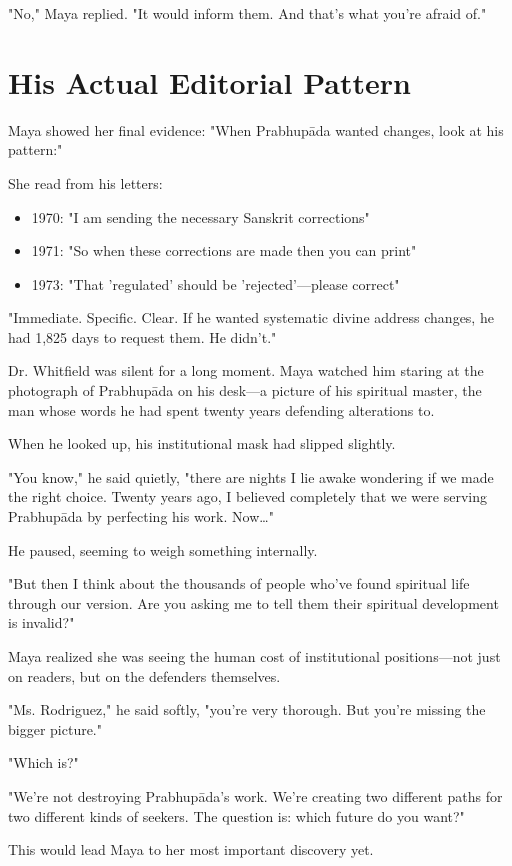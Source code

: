 \documentclass[11pt,twoside]{book}
\begin{document}
"No," Maya replied. "It would inform them. And that's what you're afraid of."
\section*{His Actual Editorial Pattern}
\label{sec:orgf6348cf}

Maya showed her final evidence: "When Prabhupāda wanted changes, look at his pattern:"

She read from his letters:
\begin{itemize}
\item 1970: "I am sending the necessary Sanskrit corrections"
\item 1971: "So when these corrections are made then you can print"
\item 1973: "That 'regulated' should be 'rejected'—please correct"
\end{itemize}

"Immediate. Specific. Clear. If he wanted systematic divine address changes, he had 1,825 days to request them. He didn't."

Dr. Whitfield was silent for a long moment. Maya watched him staring at the photograph of Prabhupāda on his desk—a picture of his spiritual master, the man whose words he had spent twenty years defending alterations to.

When he looked up, his institutional mask had slipped slightly. 

"You know," he said quietly, "there are nights I lie awake wondering if we made the right choice. Twenty years ago, I believed completely that we were serving Prabhupāda by perfecting his work. Now\ldots{}"

He paused, seeming to weigh something internally.

"But then I think about the thousands of people who've found spiritual life through our version. Are you asking me to tell them their spiritual development is invalid?"

Maya realized she was seeing the human cost of institutional positions—not just on readers, but on the defenders themselves.

"Ms. Rodriguez," he said softly, "you're very thorough. But you're missing the bigger picture."

"Which is?"

"We're not destroying Prabhupāda's work. We're creating two different paths for two different kinds of seekers. The question is: which future do you want?"

This would lead Maya to her most important discovery yet.
\end{document}
